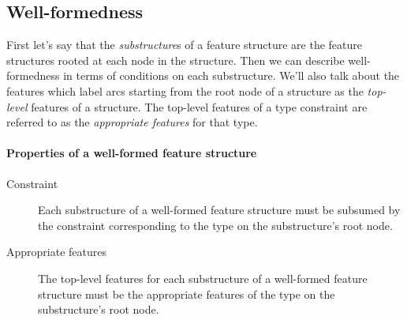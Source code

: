 \documentclass[12pt]{report}
\newcommand{\newterm}[1]{{\it #1}}
\begin{document}
\subsection{Well-formedness}
\label{easywf}

First let's say that the \newterm{substructure}s
of a feature structure are
the feature structures rooted at each node
in the structure.  Then we can describe well-formedness in terms
of conditions on each substructure.
We'll also talk about
the features which label arcs starting from the root node of a 
structure as
the \newterm{top-level} features of a structure. 
The top-level features
of a type constraint are referred to as the \newterm{appropriate features}
for that type.
  
\paragraph{Properties of a well-formed feature structure}
\begin{description}
\item[Constraint] Each substructure of a well-formed
feature structure must be subsumed by the constraint corresponding
to the type on the substructure's root node.  
\item[Appropriate features] The top-level features for each substructure
of a well-formed feature structure
must be the appropriate features of the 
type on the substructure's root node.
\end{description}
\end{document}
